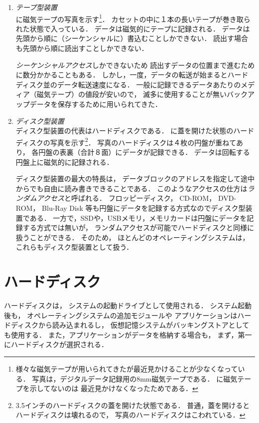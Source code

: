 \begin{enumerate}
\item \emph{テープ型装置}\\
に磁気テープの写真を示す\footnote{
様々な磁気テープが用いられてきたが最近見かけることが少なくなっている．
写真は，デジタルデータ記録用の8mm磁気テープである．
に磁気テープを示してないのは
最近見かけなくなったためである．
}．
カセットの中に１本の長いテープが巻き取られた状態で入っている．
データは磁気的にテープに記録される．
データは先頭から順に（シーケンシャルに）書込むことしかできない．
読出す場合も先頭から順に読出すことしかできない．

\emph{シーケンシャルアクセス}しかできないため
読出すデータの位置まで進むために数分かかることもある．
しかし，一度，データの転送が始まるとハードディスク並のデータ転送速度になる．
一般に記録できるデータあたりのメディア（磁気テープ）の値段が安いので，
滅多に使用することが無いバックアップデータを保存するために用いられてきた．


\item \emph{ディスク型装置} \\
ディスク型装置の代表はハードディスクである．
に蓋を開けた状態のハードディスクの写真を示す\footnote{
3.5インチのハードディスクの蓋を開けた状態である．
普通，蓋を開けるとハードディスクは壊れるので，
写真のハードディスクはこわれている．}．
写真のハードディスクは４枚の円盤が重ねてあり，
各円盤の表裏（合計８面）にデータが記録できる．
データは回転する円盤上に磁気的に記録される．

ディスク型装置の最大の特長は，
データブロックのアドレスを指定して途中からでも自由に読み書きできることである．
このようなアクセスの仕方は\emph{ランダムアクセス}と呼ばれる．
フロッピーディスク，
CD-ROM，
DVD-ROM，
Blu-Ray Disk 等も円盤にデータを記録する方式なのでディスク型装置である．
一方で，SSDや，USBメモリ，メモリカードは円盤にデータを記録する方式では無いが，
ランダムアクセスが可能でハードディスクと同様に扱うことができる．
そのため，
ほとんどのオペレーティングシステムは，これらもディスク型装置として扱う．


\end{enumerate}

\section{ハードディスク}
ハードディスクは，
システムの起動ドライブとして使用される．
システム起動後も，
オペレーティングシステムの追加モジュールや
アプリケーションはハードディスクから読み込まれるし，
仮想記憶システムがバッキングストアとしても使用する．
また，アプリケーションがデータを格納する場合も，
まず，第一にハードディスクが選択される．

